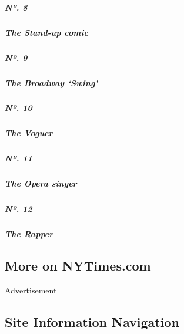 \hypertarget{nuxba-8}{%
\subparagraph{Nº. 8}\label{nuxba-8}}

\hypertarget{the-stand-up-comic}{%
\subparagraph{The Stand-up comic}\label{the-stand-up-comic}}

\href{https://www.nytimes3xbfgragh.onion/interactive/2019/05/30/magazine/aladdin-musical-new-york.html}{}

\hypertarget{nuxba-9}{%
\subparagraph{Nº. 9}\label{nuxba-9}}

\hypertarget{the-broadway-swing}{%
\subparagraph{The Broadway `Swing'}\label{the-broadway-swing}}

\href{https://www.nytimes3xbfgragh.onion/interactive/2019/05/30/magazine/vogue-kiki-new-york.html}{}

\hypertarget{nuxba-10}{%
\subparagraph{Nº. 10}\label{nuxba-10}}

\hypertarget{the-voguer}{%
\subparagraph{The Voguer}\label{the-voguer}}

\href{https://www.nytimes3xbfgragh.onion/interactive/2019/05/30/magazine/metropolitan-opera-singer-new-york.html}{}

\hypertarget{nuxba-11}{%
\subparagraph{Nº. 11}\label{nuxba-11}}

\hypertarget{the-opera-singer}{%
\subparagraph{The Opera singer}\label{the-opera-singer}}

\href{https://www.nytimes3xbfgragh.onion/interactive/2019/05/30/magazine/princess-nokia-new-york.html}{}

\hypertarget{nuxba-12}{%
\subparagraph{Nº. 12}\label{nuxba-12}}

\hypertarget{the-rapper}{%
\subparagraph{The Rapper}\label{the-rapper}}

\hypertarget{more-on-nytimescom}{%
\subsection{More on NYTimes.com}\label{more-on-nytimescom}}

Advertisement

\hypertarget{site-information-navigation}{%
\subsection{Site Information
Navigation}\label{site-information-navigation}}

